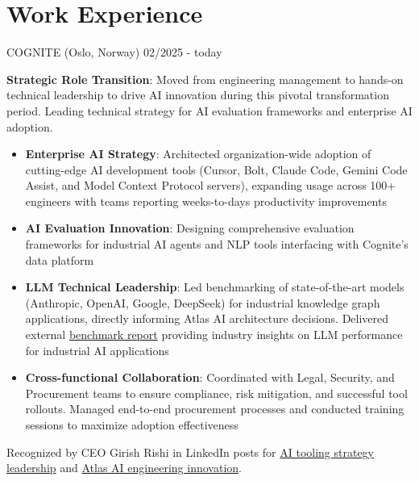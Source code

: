 \documentclass[singlesided,
               paper=a4,
               fontsize=10pt
              ]{my-resume}
\begin{document}
\section[\faBriefcase]{Work Experience}
	{COGNITE (Oslo, Norway)}
    {02/2025 - today}
    {
        \textbf{Strategic Role Transition}: Moved from engineering management to hands-on technical leadership to drive AI innovation during this pivotal transformation period. Leading technical strategy for AI evaluation frameworks and enterprise AI adoption.

        \begin{itemize}[leftmargin=2em]
            \item \textbf{Enterprise AI Strategy}: Architected organization-wide adoption of cutting-edge AI development tools (Cursor, Bolt, Claude Code, Gemini Code Assist, and Model Context Protocol servers), expanding usage across 100+ engineers with teams reporting weeks-to-days productivity improvements
            \item \textbf{AI Evaluation Innovation}: Designing comprehensive evaluation frameworks for industrial AI agents and NLP tools interfacing with Cognite's data platform
            \item \textbf{LLM Technical Leadership}: Led benchmarking of state-of-the-art models (Anthropic, OpenAI, Google, DeepSeek) for industrial knowledge graph applications, directly informing Atlas AI architecture decisions. Delivered external \href{https://www.cognite.com/en/resources/white-papers/atlas-ai-slm-llm-benchmark-report}{benchmark report} providing industry insights on LLM performance for industrial AI applications
            \item \textbf{Cross-functional Collaboration}: Coordinated with Legal, Security, and Procurement teams to ensure compliance, risk mitigation, and successful tool rollouts. Managed end-to-end procurement processes and conducted training sessions to maximize adoption effectiveness
        \end{itemize}

        Recognized by CEO Girish Rishi in LinkedIn posts for \href{https://www.linkedin.com/posts/girish-rishi-4392587_peet-cremer-our-engineering-leader-showing-activity-7343289548442955776-Zu2p?utm_source=share&utm_medium=member_desktop&rcm=ACoAADAmkPABVhPkjuk0vvCtiRSid_p7fC4zU_o}{AI tooling strategy leadership} and \href{https://www.linkedin.com/posts/girish-rishi-4392587_atlas-ai-is-all-about-enabling-our-customers-activity-7336752688279207936-f58Y?utm_source=share&utm_medium=member_desktop&rcm=ACoAADAmkPABVhPkjuk0vvCtiRSid_p7fC4zU_o}{Atlas AI engineering innovation}.
    }
\end{document}
